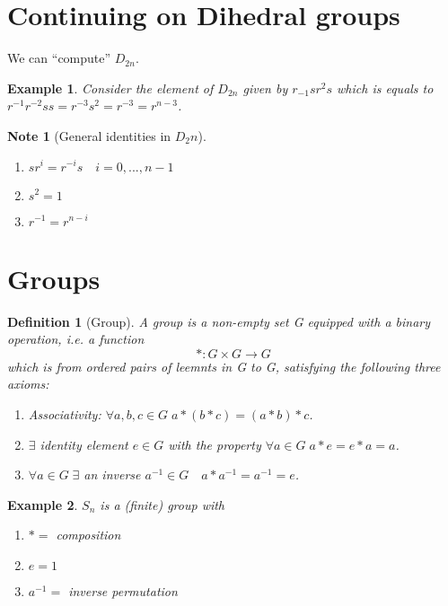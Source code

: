 \documentclass[11pt, oneside]{book}
\theoremstyle{break}
\newtheorem*{note}{Note}
\newtheorem{defn}{Definition}[section]
\newtheorem{eg}{Example}[section]
\begin{document}
\section{Continuing on Dihedral groups}

We can ``compute'' $D_{2n}$.

\begin{eg}
    Consider the element of $D_{2n}$ given by $r_{-1}sr^2s$ which is equals to $r^{-1}r^{-2}ss = r^{-3}s^2 = r^{-3} = r^{n - 3}$.
\end{eg}

\begin{note}[General identities in $D_2n$]
    \begin{enumerate}
        \item $sr^i = r^{-i}s \quad i = 0, ..., n - 1$
        \item $s^2 = 1$
        \item $r^{-1} = r^{n - i}$
    \end{enumerate}
\end{note}

\section{Groups}\label{sect:group_intro}

\begin{defn}[Group]
    A group is a non-empty set G equipped with a binary operation, i.e. a function
    \begin{equation}
        * : G \times G \to G
    \end{equation}
    which is from ordered pairs of leemnts in G to G, satisfying the following three axioms:
    \begin{enumerate}
        \item Associativity: $\forall a, b, c \in G \; a * (b * c) = (a * b) * c$.
        \item $\exists$ identity element $e \in G$ with the property $\forall a \in G \; a * e = e * a = a$.
        \item $\forall a \in G \; \exists $ an inverse $a^{-1} \in G \quad a * a^{-1} = a^{-1} = e$.
    \end{enumerate}
\end{defn}

\begin{eg}
    $S_n$ is a (finite) group with
    \begin{enumerate}
        \item $* = $ composition
        \item $e = 1$
        \item $a^{-1} = $ inverse permutation
    \end{enumerate}
\end{eg}
\end{document}
